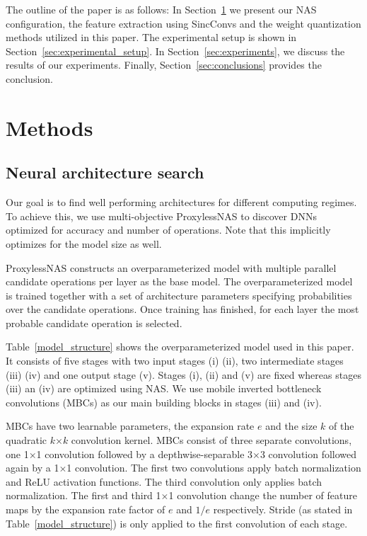 \documentclass[a4paper]{article}
\begin{document}
The outline of the paper is as follows: In Section~\ref{sec:methods} we present our NAS configuration, the feature extraction using SincConvs and the weight quantization methods utilized in this paper. The experimental setup is shown in Section~\ref{sec:experimental_setup}. In Section~\ref{sec:experiments}, we discuss the results of our experiments. Finally, Section~\ref{sec:conclusions} provides the conclusion.

\section{Methods}
\label{sec:methods}

\subsection{Neural architecture search}
Our goal is to find well performing architectures for different computing regimes. To achieve this, we use multi-objective ProxylessNAS \cite{Cai2019} to discover DNNs optimized for accuracy and number of operations. Note that this implicitly optimizes for the model size as well.

ProxylessNAS constructs an overparameterized model with multiple parallel candidate operations per layer as the base model. The overparameterized model is trained together with a set of architecture parameters specifying probabilities over the candidate operations. Once training has finished, for each layer the most probable candidate operation is selected.

Table~\ref{model_structure} shows the overparameterized model used in this paper. It consists of five stages with two input stages (i) (ii), two intermediate stages (iii) (iv) and one output stage (v). Stages (i), (ii) and (v) are fixed whereas stages (iii) an (iv) are optimized using NAS. We use mobile inverted bottleneck convolutions (MBCs) \cite{Sandler2018} as our main building blocks in stages (iii) and (iv).

MBCs have two learnable parameters, the expansion rate $e$ and the size $k$ of the quadratic $k$$\times$$k$ convolution kernel. MBCs consist of three separate convolutions, one 1$\times$1 convolution followed by a depthwise-separable 3$\times$3 convolution followed again by a 1$\times$1 convolution. The first two convolutions apply batch normalization and ReLU activation functions. The third convolution only applies batch normalization. The first and third 1$\times$1 convolution change the number of feature maps by the expansion rate factor of $e$ and $1/e$ respectively. Stride (as stated in Table~\ref{model_structure}) is only applied to the first convolution of each stage.
\end{document}
